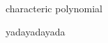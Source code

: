 \documentclass[class=article, crop=false]{standalone}
\begin{document}
\begin{zettel}{characteric polynomial}

\begin{mdframed}
\vspace*{-8pt}
\begin{definition}
    
    yadayadayada
\end{definition}
\end{mdframed}

\end{zettel}
\end{document}
